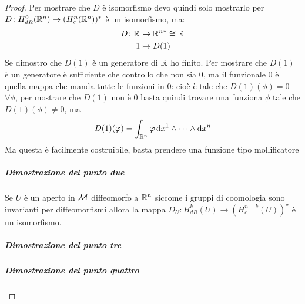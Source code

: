 \begin{proof}
  Per mostrare che $ D $ è isomorfismo devo quindi solo mostrarlo per
  $ D \colon H^0_{dR}(\mathbb{R}^{n}) \to (H^n_c(\mathbb{R}^{n}))^* $ è un isomorfismo, ma:
  \begin{align*}
    D \colon \mathbb{R}^{} & \to {\mathbb{R}^{n}}^* \cong \mathbb{R}^{} \\
    1 & \mapsto D(1)
  \end{align*}
  Se dimostro che $ D(1) $ è un generatore di $ \mathbb{R}^{} $ ho finito. Per mostrare
  che $ D(1) $ è un generatore è sufficiente che controllo che non sia $ 0 $,
  ma il funzionale $ 0 $ è quella mappa che manda tutte le funzioni in $ 0 $:
  cioè è tale che $ D(1)(\phi) = 0 $ $ \forall \phi $, per mostrare che $ D(1) $ non è $ 0 $
  basta quindi trovare una funziona $ \phi $ tale che $ D(1)(\phi) \not = 0 $, ma
  \[
    D(1)(\varphi) = \int_{\mathbb{R}^{n}} \varphi \operatorname{d}\!{x}^1 \wedge \dots \wedge \operatorname{d}\!{x}^n
  \]
  Ma questa è facilmente costruibile, basta prendere una funzione tipo
  mollificatore

  \subparagraph{Dimostrazione del punto due} Se $ U $ è un aperto in $ \mathcal{M} $
  diffeomorfo a $ \mathbb{R}^{n} $ siccome i gruppi di coomologia sono invarianti per
  diffeomorfismi allora la mappa
  $ D_U \colon H^k_{dR}(U) \to (H^{n-k}_c(U))^\star $ è un isomorfismo.

  \subparagraph{Dimostrazione del punto tre}
  \subparagraph{Dimostrazione del punto quattro}


\end{proof}
